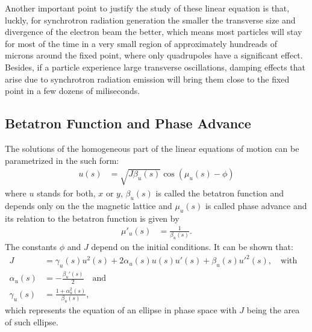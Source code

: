 \documentclass[
	12pt,				%
	openright,			%
	oneside,			%
	a4paper,		%
	chapter=TITLE,		%
	section=TITLE,		%
    brazil,				%
	english,			%
	sumario=tradicional,
	]{abntex2}
\begin{document}
	Another important point to justify the study of these linear equation is that, luckly, for synchrotron radiation generation the smaller the transverse size and divergence of the electron beam the better, which means most particles will stay for most of the time in a very small region of approximately hundreads of microns around the fixed point, where only quadrupoles have a significant effect. Besides, if a particle experience large transverse oscillations, damping effects that arise due to synchrotron radiation emission will bring them close to the fixed point in a few dozens of miliseconds.


    \subsection{Betatron Function and Phase Advance} \label{ssub:betatron_function}

	The solutions of the homogeneous part of the linear equations of motion can be parametrized in the such form:
	\begin{align} \label{eq:betatron_motion}
		u(s) &= \sqrt{J\beta_u(s)} \cos(\mu_u(s) - \phi)
	\end{align}
	where $u$ stands for both, $x$ or $y$, $\beta_u(s)$ is called the betatron function and depends only on the the magnetic lattice and $\mu_u(s)$ is called phase advance and its relation to the betatron function is given by
	\begin{align}
		\mu'_u(s) &= \frac{1}{\beta_u(s)}.
	\end{align}
	The constants $\phi$ and $J$ depend on the initial conditions. It can be shown that:
	\begin{align} \label{eq:linear_invariant}
		J &= \gamma_u(s)u^2(s) + 2\alpha_u(s)u(s)u'(s) + \beta_u(s)u'^2(s),
												\quad \text{with}& \\
        \alpha_u(s) &= -\frac{\beta_u'(s)}{2} \quad \text{and}& \nonumber \\ \nonumber
		\gamma_u(s) &= \frac{1+\alpha_u^2(s)}{\beta_u(s)},&
	\end{align}
	which represents the equation of an ellipse in phase space with $J$ being the area of such ellipse.
\end{document}
